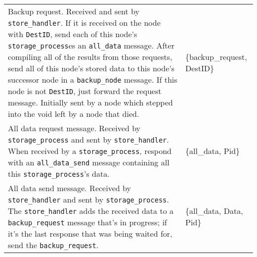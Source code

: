 \documentclass[12pt,letterpaper]{article}
\renewcommand{\tt}[1]{\texttt{#1}}
\newcommand{\sh}{\tt{store\_handler}}
\renewcommand{\sp}{\tt{storage\_process}}
\begin{document}
\begin{longtable}{p{4.5in}T}
Backup request.  Received and sent by \sh.  If it is received on the node with \tt{DestID}, send each of this node's \sp es an \tt{all\_data} message.  After compiling all of the results from those requests, send all of this node's stored data to this node's successor node in a \tt{backup\_node} message.  If this node is not \tt{DestID}, just forward the request message.  Initially sent by a node which stepped into the void left by a node that died.  & \{backup\_request, DestID\} \\

All data request message.  Received by \sp{} and sent by \sh.  When received by a \sp, respond with an \tt{all\_data\_send} message containing all this \sp's data.  & \{all\_data, Pid\} \\

All data send message.  Received by \sh{} and sent by \sp.  The \sh{} adds the received data to a \tt{backup\_request} message that's in progress; if it's the last response that was being waited for, send the \tt{backup\_request}. & \{all\_data, Data, Pid\}




\end{longtable}
\end{document}
